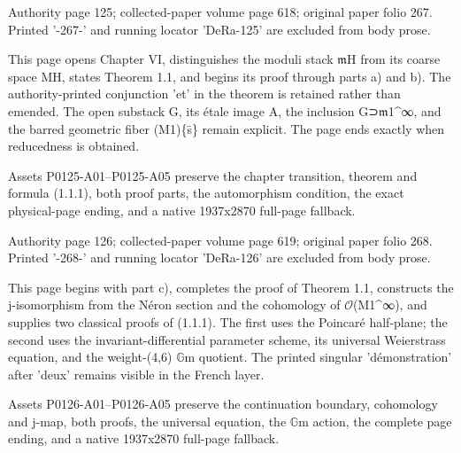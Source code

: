 \documentclass[11pt,a4paper]{article}
\begin{document}
\par\medskip
\hypertarget{D018-P0125}{}
\par\smallskip
Authority page 125; collected-paper volume page 618; original paper folio 267. Printed '-267-' and running locator 'DeRa-125' are excluded from body prose.

This page opens Chapter VI, distinguishes the moduli stack \ensuremath{\mathfrak{m}}\textunderscore{}H from its coarse space M\textunderscore{}H, states Theorem 1.1, and begins its proof through parts a) and b). The authority-printed conjunction 'et' in the theorem is retained rather than emended. The open substack G, its étale image A, the inclusion G⊃\ensuremath{\mathfrak{m}}\textunderscore{}1\textasciicircum{}∞, and the barred geometric fiber (M\textunderscore{}1)\textunderscore{}\{s̄\} remain explicit. The page ends exactly when reducedness is obtained.

Assets P0125-A01--P0125-A05 preserve the chapter transition, theorem and formula (1.1.1), both proof parts, the automorphism condition, the exact physical-page ending, and a native 1937x2870 full-page fallback.


\par\medskip
\hypertarget{D018-P0126}{}
\par\smallskip
Authority page 126; collected-paper volume page 619; original paper folio 268. Printed '-268-' and running locator 'DeRa-126' are excluded from body prose.

This page begins with part c), completes the proof of Theorem 1.1, constructs the j-isomorphism from the Néron section and the cohomology of \ensuremath{\mathcal{O}}(M\textunderscore{}1\textasciicircum{}∞), and supplies two classical proofs of (1.1.1). The first uses the Poincaré half-plane; the second uses the invariant-differential parameter scheme, its universal Weierstrass equation, and the weight-(4,6) \ensuremath{\mathbb{G}}\textunderscore{}m quotient. The printed singular 'démonstration' after 'deux' remains visible in the French layer.

Assets P0126-A01--P0126-A05 preserve the continuation boundary, cohomology and j-map, both proofs, the universal equation, the \ensuremath{\mathbb{G}}\textunderscore{}m action, the complete page ending, and a native 1937x2870 full-page fallback.
\end{document}
